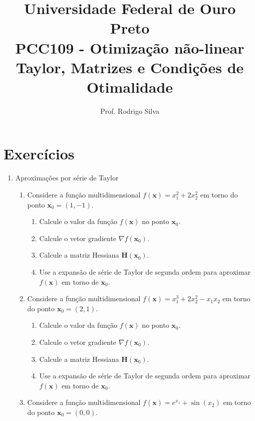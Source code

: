 \documentclass{article}
\title{\vspace{-2 cm}Universidade Federal de Ouro Preto \\ PCC109 - Otimização não-linear \\ Taylor, Matrizes e Condições de Otimalidade}
\author{Prof. Rodrigo Silva}
\begin{document}
\maketitle

\section{Exercícios}

\begin{enumerate}
    \item Aproximações por série de Taylor
    \begin{enumerate}
        \item Considere a função multidimensional \(f(\mathbf{x}) = x_1^2 + 2x_2^2\) em torno do ponto \(\mathbf{x}_0 = (1, -1)\).
        \begin{enumerate}
            \item Calcule o valor da função \(f(\mathbf{x})\) no ponto \(\mathbf{x}_0\).
            \item Calcule o vetor gradiente \(\nabla f(\mathbf{x}_0)\).
            \item  Calcule a matriz Hessiana \(\mathbf{H}(\mathbf{x}_0)\).
            \item Use a expansão de série de Taylor de segunda ordem para aproximar \(f(\mathbf{x})\) em torno de \(\mathbf{x}_0\).
        \end{enumerate}

    \item Considere a função multidimensional \(f(\mathbf{x}) = x_1^3 + 2x_2^2 - x_1x_2\) em torno do ponto \(\mathbf{x}_0 = (2, 1)\).

        \begin{enumerate}
            \item Calcule o valor da função \(f(\mathbf{x})\) no ponto \(\mathbf{x}_0\).
            \item  Calcule o vetor gradiente \(\nabla f(\mathbf{x}_0)\).
            \item  Calcule a matriz Hessiana \(\mathbf{H}(\mathbf{x}_0)\).
            \item  Use a expansão de série de Taylor de segunda ordem para aproximar \(f(\mathbf{x})\) em torno de \(\mathbf{x}_0\).
            
        \end{enumerate}

    \item Considere a função multidimensional \(f(\mathbf{x}) = e^{x_1} + \sin(x_2)\) em torno do ponto \(\mathbf{x}_0 = (0, 0)\).
    

\end{enumerate}
\end{enumerate}
\end{document}
